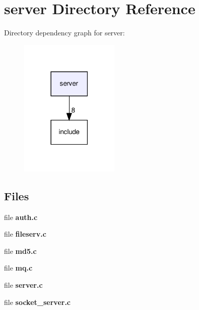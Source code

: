 \section{server Directory Reference}
\label{dir_41e1742e44e2de38b3bc91f993fed282}
Directory dependency graph for server\+:\nopagebreak
\begin{figure}[H]
\begin{center}
\leavevmode
\includegraphics[width=134pt]{dir_41e1742e44e2de38b3bc91f993fed282_dep}
\end{center}
\end{figure}
\subsection*{Files}
\begin{DoxyCompactItemize}
\item 
file \textbf{ auth.\+c}
\item 
file \textbf{ fileserv.\+c}
\item 
file \textbf{ md5.\+c}
\item 
file \textbf{ mq.\+c}
\item 
file \textbf{ server.\+c}
\item 
file \textbf{ socket\+\_\+server.\+c}
\end{DoxyCompactItemize}
